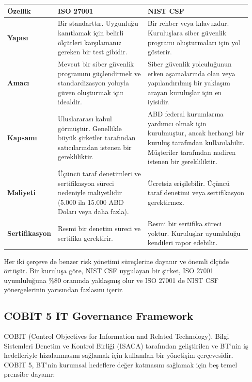 \begin{center}
\begin{tabularx}{0.95\textwidth}{|>{\raggedright\arraybackslash}X|>{\centering\arraybackslash}X|>{\centering\arraybackslash}X|}
\hline
\textbf{Özellik} & \textbf{ISO 27001} & \textbf{NIST CSF} \\
\hline
\textbf{Yapısı} & Bir standarttır. Uygunluğu kanıtlamak için belirli ölçütleri karşılamanız gereken bir test gibidir. & Bir rehber veya kılavuzdur. Kuruluşlara siber güvenlik programı oluşturmaları için yol gösterir. \\
\hline
\textbf{Amacı} & Mevcut bir siber güvenlik programını güçlendirmek ve standardizasyon yoluyla güven oluşturmak için idealdir. & Siber güvenlik yolculuğunun erken aşamalarında olan veya yapılandırılmış bir yaklaşım arayan kuruluşlar için en iyisidir. \\
\hline
\textbf{Kapsamı} & Uluslararası kabul görmüştür. Genellikle büyük şirketler tarafından satıcılarından istenen bir gerekliliktir. & ABD federal kurumlarına yardımcı olmak için kurulmuştur, ancak herhangi bir kuruluş tarafından kullanılabilir. Müşteriler tarafından nadiren istenen bir gerekliliktir. \\
\hline
\textbf{Maliyeti} & Üçüncü taraf denetimleri ve sertifikasyon süreci nedeniyle maliyetlidir (5.000 ila 15.000 ABD Doları veya daha fazla). & Ücretsiz erişilebilir. Üçüncü taraf denetimi veya sertifikasyon gerektirmez. \\
\hline
\textbf{Sertifikasyon} & Resmi bir denetim süreci ve sertifika gerektirir. & Resmi bir sertifika süreci yoktur. Kuruluşlar uyumluluğu kendileri rapor edebilir. \\
\hline
\end{tabularx}
\end{center}

Her iki çerçeve de benzer risk yönetimi süreçlerine dayanır ve önemli ölçüde örtüşür. Bir kuruluşa göre, NIST CSF uygulayan bir şirket, ISO 27001 uyumluluğuna \%80 oranında yaklaşmış olur ve ISO 27001 de NIST CSF yönergelerinin yarısından fazlasını içerir.

\subsection{COBIT 5 IT Governance Framework}

COBIT (Control Objectives for Information and Related Technology), Bilgi Sistemleri Denetim ve Kontrol Birliği (ISACA) tarafından geliştirilen ve BT'nin iş hedefleriyle hizalanmasını sağlamak için kullanılan bir yönetişim çerçevesidir. COBIT 5, BT'nin kurumsal hedeflere değer katmasını sağlamak için beş temel prensibe dayanır:

